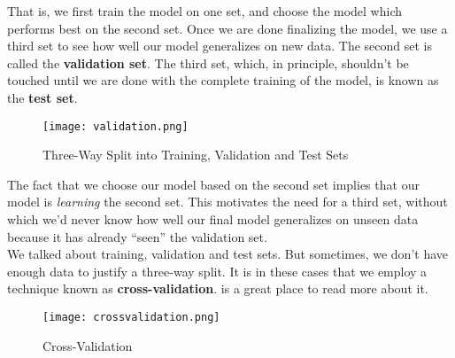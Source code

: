 \documentclass[12pt]{article}
\begin{document}
\noindent That is, we first train the model on one set, and choose the model which performs best on the second set. Once we are done finalizing the model, we use a third set to see how well our model generalizes on new data. The second set is called the \textbf{validation set}. The third set, which, in principle, shouldn't be touched until we are done with the complete training of the model, is known as the \textbf{test set}. 
\\

\begin{figure}[h]
\centering
\texttt{[image: validation.png]}
\caption{Three-Way Split into Training, Validation and Test Sets \cite{twowaysplit}}
\end{figure}


\noindent The fact that we choose our model based on the second set implies that our model is \textit{learning} the second set. This motivates the need for a third set, without which we'd never know how well our final model generalizes on unseen data because it has already ``seen'' the validation set.
\\

\noindent We talked about training, validation and test sets. But sometimes, we don't have enough data to justify a three-way split. It is in these cases that we employ a technique known as \textbf{cross-validation}.  \cite{crossvalidation} is a great place to read more about it.


\begin{figure}[h]

\centering
\texttt{[image: crossvalidation.png]}
\caption{Cross-Validation \cite{crossvalidation}}
\end{figure}


\FloatBarrier



%


\end{document}
